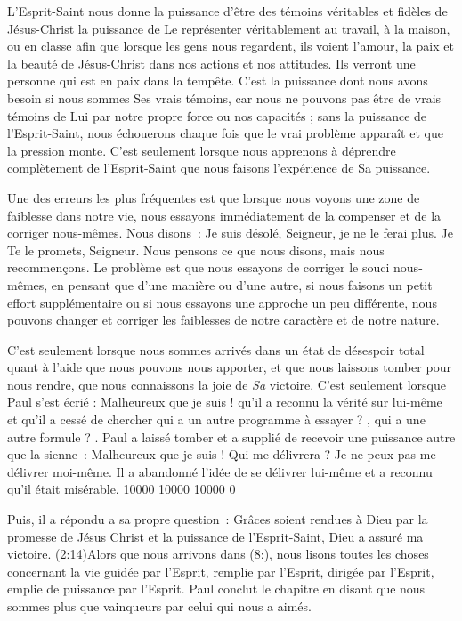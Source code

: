 L'Esprit-Saint nous donne la puissance d'être des témoins véritables
 et fidèles de Jésus-Christ \ocadr la puissance de Le représenter
 véritablement au travail, à la maison, ou en classe \fcadr{}
 afin que lorsque les gens nous regardent, ils voient l'amour,
 la paix et la beauté de Jésus-Christ dans nos actions et nos attitudes.
 Ils verront une personne qui est en paix dans la tempête.
 C'est la puissance dont nous avons besoin si nous sommes Ses vrais témoins,
 car nous ne pouvons pas être de vrais témoins de Lui par notre propre force
 ou nos capacités ; sans la puissance de l'Esprit-Saint, nous échouerons
 chaque fois que le vrai problème apparaît et que la pression monte.
 C'est seulement lorsque nous apprenons à déprendre complètement
 de l'Esprit-Saint que nous faisons l'expérience de Sa puissance.

Une des erreurs les plus fréquentes est que lorsque nous voyons une zone
 de faiblesse dans notre vie, nous essayons immédiatement de la compenser
 et de la corriger nous-mêmes. Nous disons~:
 \og Je suis désolé, Seigneur, je ne le ferai plus.
 Je Te le promets, Seigneur. \fg{}
 Nous pensons ce que nous disons, mais nous recommençons.
 Le problème est que nous essayons de corriger le souci nous-mêmes,
 en pensant que d'une manière ou d'une autre, si nous faisons un petit effort
 supplémentaire ou si nous essayons une approche un peu différente,
 nous pouvons changer et corriger les faiblesses de notre caractère
 et de notre nature.

C'est seulement lorsque nous sommes arrivés dans un état de désespoir total
 quant à l'aide que nous pouvons nous apporter, et que nous laissons
 tomber pour nous rendre, que nous connaissons la joie de \emph{Sa} victoire.
 C'est seulement lorsque Paul s'est écrié :
 \og Malheureux que je suis ! \fg{} qu'il a reconnu la vérité sur lui-même
 et qu'il a cessé de chercher \og qui a un autre programme à essayer ? \fg{},
 \og qui a une autre formule ? \fg{}.
 Paul a laissé tomber et a supplié de recevoir une puissance
 autre que la sienne~: \og Malheureux que je suis ! Qui me délivrera ?
 Je ne peux pas me délivrer moi-même. \fg{}
 Il a abandonné l'idée de se délivrer lui-même et a reconnu
 qu'il était misérable.
 \begingroup{} 10000 10000 10000 0
 \par\endgroup

\begin{specialpar}{}
Puis, il a répondu a sa propre question~:
 \og Grâces soient rendues à Dieu par la promesse de Jésus Christ
 et la puissance de l'Esprit-Saint, Dieu a assuré ma victoire. \fg{}
 (2:14)Alors que nous arrivons dans (8:),
 nous lisons toutes les choses concernant la vie guidée par l'Esprit,
 remplie par l'Esprit, dirigée par l'Esprit, emplie de puissance par l'Esprit.
 Paul conclut le chapitre en disant que nous sommes \og plus que vainqueurs
 par celui qui nous a aimés. \fg{}
\end{specialpar}

